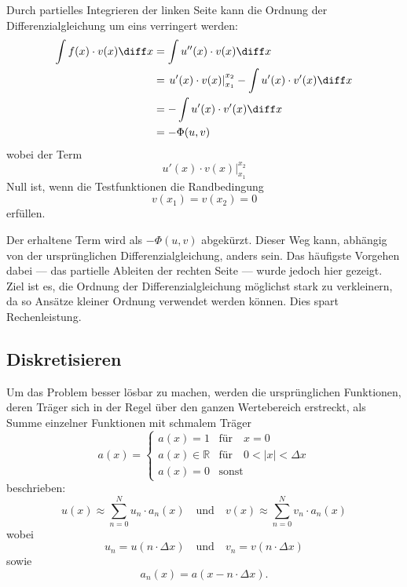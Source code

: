 Durch partielles Integrieren der linken Seite kann die Ordnung der Differenzialgleichung um eins verringert werden:
\begin{align}
    \int f(x) \cdot v(x) \diff x &= \int u''(x) \cdot v(x) \diff x \\
                                 &= \left. u'(x) \cdot v(x) \right|_{x_1}^{x_2} - \int u'(x) \cdot v'(x) \diff x \\
                                 &= - \int u'(x) \cdot v'(x) \diff x \\
                                 &= - \Phi(u, v)
\end{align}
wobei der Term
\begin{equation}
    \left. u'(x) \cdot v(x) \right|_{x_1}^{x_2}
\end{equation}
Null ist, wenn die Testfunktionen die Randbedingung
\begin{equation}
    v(x_1) = v(x_2) = 0
\end{equation}
erfüllen. %

Der erhaltene Term wird als $-\Phi(u, v)$ abgekürzt.
Dieser Weg kann, abhängig von der ursprünglichen Differenzialgleichung, anders sein.
Das häufigste Vorgehen dabei --- das partielle Ableiten der rechten Seite --- wurde jedoch hier gezeigt.
Ziel ist es, die Ordnung der Differenzialgleichung möglichst stark zu verkleinern, da so Ansätze kleiner Ordnung verwendet werden können.
Dies spart Rechenleistung.


\subsection{Diskretisieren\label{fem:1d:diskretisieren}}
Um das Problem besser lösbar zu machen, werden die ursprünglichen Funktionen, deren Träger sich in der Regel über den ganzen Wertebereich erstreckt, als Summe einzelner Funktionen mit schmalem Träger 
\begin{equation}
    a(x) = \left\{ \begin{array}{ll}
        a(x) = 1            & \text{für} \quad x = 0 \\
        a(x) \in \mathbb{R} & \text{für} \quad 0 < |x| < \Delta x \\
        a(x) = 0            & \text{sonst} 
    \end{array} \right.
\end{equation}
beschrieben:
\begin{equation}
    u(x) \approx \sum_{n=0}^{N}{u_n \cdot a_n(x)} \quad
    \text{und} \quad
    v(x) \approx \sum_{n=0}^{N}{v_n \cdot a_n(x)}
\end{equation}
wobei 
\begin{equation}
    u_n = u(n \cdot \Delta x) \quad
    \text{und} \quad
     v_n = v(n \cdot \Delta x)
\end{equation}
sowie 
\begin{equation}
    a_n(x) = a(x - n \cdot \Delta x).
\end{equation}

